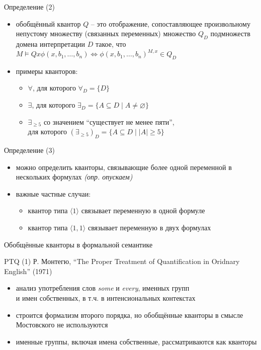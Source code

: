 \documentclass{beamer}
\begin{document}
\begin{frame}{Определение (2)}
\begin{itemize}
	\item обобщённый квантор $Q$ -- это отображение, сопоставляющее произвольному непустому множеству (связанных переменных) множество $Q_D$ подмножеств домена интерпретации $D$ такое, что $M \models Q x \phi(x, b_1, \dots, b_n) \Leftrightarrow \phi(x, b_1, \dots, b_n)^{M,x} \in Q_D$
    \bigskip
    \item примеры кванторов:
    \medskip
    \begin{itemize}
        \item $\forall$, для которого $\forall_D = \{ D \}$
        \medskip
        \item $\exists$, для которого $\exists_D = \{ A \subseteq D \; | \; A \neq \varnothing \}$
        \medskip
        \item $\exists_{\geq 5}$ со значением ``существует не менее пяти'',\\ для которого $(\exists_{\geq 5})_D = \{ A \subseteq D \; | \; |A| \geq 5 \}$
    \end{itemize}	
\end{itemize}
\end{frame}

\begin{frame}{Определение (3)}
\begin{itemize}
	\item можно определить кванторы, связывающие более одной переменной в нескольких формулах \textit{(опр. опускаем)}
	\medskip
	\item важные частные случаи:
	\medskip
	\begin{itemize}
        \item квантор типа $\langle 1 \rangle$ связывает переменную в одной формуле
        \medskip
        \item квантор типа $\langle 1, 1 \rangle$ связывает переменную в двух формулах
    \end{itemize}
\end{itemize}
\end{frame}

\begin{frame}{}
\begin{center}
Обобщённые кванторы в формальной семантике
\end{center}
\end{frame}

\begin{frame}{PTQ (1)}
Р. Монтегю, ``The Proper Treatment of Quantification in Oridnary English'' (1971)
\bigskip
\begin{itemize}
    \item анализ употребления слов \textit{some} и \textit{every}, именных групп \\и имен собственных, в т.ч. в интенсиональных контекстах
	\item строится формализм второго порядка, но обобщённые кванторы в смысле Мостовского не используются
	\item именные группы, включая имена собственные, рассматриваются как кванторы
\end{itemize}
\end{frame}
\end{document}
